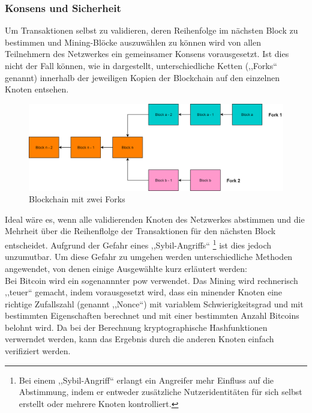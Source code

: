     \subsubsection{Konsens und Sicherheit}
    \label{sec:sota_blockchain_consensus}
        Um Transaktionen selbst zu validieren, deren Reihenfolge im nächsten Block zu bestimmen und Mining-Blöcke auszuwählen zu können wird von allen Teilnehmern des Netzwerkes ein gemeinsamer Konsens vorausgesetzt. 
        Ist dies nicht der Fall können, wie in  dargestellt, unterschiedliche Ketten (,,Forks`` genannt) innerhalb der jeweiligen Kopien der Blockchain auf den einzelnen Knoten entsehen. 
        
        \begin{figure}[H]
        	\centering
        	\includegraphics[width=\textwidth]{graphics/BCForks.png}
        	\caption[Blockchain mit Forks]{Blockchain mit zwei Forks}
        	\label{fig:bc_forks}
        \end{figure}
        \noindent Ideal wäre es, wenn alle validierenden Knoten des Netzwerkes abstimmen und die Mehrheit über die Reihenflolge der Transaktionen für den nächsten Block entscheidet.\cite{Christidis2016} 
        Aufgrund der Gefahr eines ,,Sybil-Angriffs``\cite{Trifa2014}
        \!\footnote{Bei einem ,,Sybil-Angriff`` erlangt ein Angreifer mehr Einfluss auf die Abstimmung, indem er entweder zusätzliche Nutzeridentitäten für sich selbst erstellt oder mehrere Knoten kontrolliert.
        } ist dies jedoch unzumutbar.
        Um diese Gefahr zu umgehen werden unterschiedliche Methoden angewendet, von denen einige Ausgewählte kurz erläutert werden:\cite{Christidis2016}
        \smallskip\\
        Bei Bitcoin wird ein sogenannnter \gls{pow} verwendet. 
        Das Mining wird rechnerisch ,,teuer`` gemacht, indem vorausgesetzt wird, dass ein minender Knoten eine richtige Zufallszahl (genannt ,,Nonce``) mit variablem Schwierigkeitsgrad und mit bestimmten Eigenschaften berechnet und mit einer bestimmten Anzahl Bitcoins belohnt wird. 
        Da bei der Berechnung kryptographische Hashfunktionen verwerndet werden, kann das Ergebnis durch die anderen Knoten einfach verifiziert werden. 
